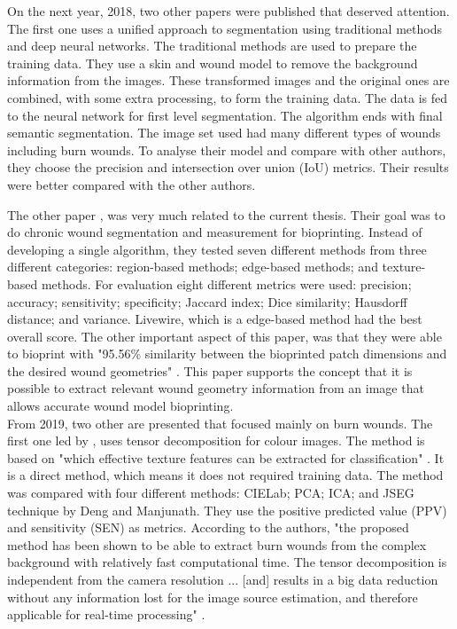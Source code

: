 On the next year, 2018, two other papers were published that deserved attention. The first one \cite{Li2018_composite_model_wound_segmentation_traditional_deep_nn} uses a unified approach to segmentation using traditional methods and deep neural networks. The traditional methods are used to prepare the training data. They use a skin and wound model to remove the background information from the images. These transformed images and the original ones are combined, with some extra processing, to form the training data. The data is fed to the neural network for first level segmentation. The algorithm ends with final semantic segmentation. The image set used had many different types of wounds including burn wounds. To analyse their model and compare with other authors, they choose the precision and intersection over union (IoU) metrics. Their results were better compared with the other authors.

The other paper \cite{Gholami2018_segmentation_measurements_chronic_wounds_bioprinting}, was very much related to the current thesis. Their goal was to do chronic wound segmentation and measurement for bioprinting. Instead of developing a single algorithm, they tested seven different methods from three different categories: region-based methods; edge-based methods; and texture-based methods. For evaluation eight different metrics were used: precision; accuracy; sensitivity; specificity; Jaccard index; Dice similarity; Hausdorff distance; and variance. Livewire, which is a edge-based method had the best overall score. The other important aspect of this paper, was that they were able to bioprint with "95.56\% similarity between the bioprinted patch dimensions and the desired wound geometries" \cite{Gholami2018_segmentation_measurements_chronic_wounds_bioprinting}. This paper supports the concept that it is possible to extract relevant wound geometry information from an image that allows accurate wound model bioprinting.\\

From 2019, two other are presented that focused mainly on burn wounds. The first one led by \citeauthor{Cirillo2019a_tensor_decomposition_segmentation_burn_wounds}, uses tensor decomposition for colour images. The method is based on "which effective texture features can be extracted for classification" \cite{Cirillo2019a_tensor_decomposition_segmentation_burn_wounds}. It is a direct method, which means it does not required training data. The method was compared with four different methods: CIELab; PCA; ICA; and JSEG technique by Deng and Manjunath. They use the positive predicted value (PPV) and sensitivity
(SEN) as metrics. According to the authors, "the proposed method has been shown to be able to extract burn wounds from the complex background with relatively fast computational time. The tensor decomposition is independent from the camera resolution ... [and] results in a big data reduction without any information lost for the image source estimation, and therefore applicable for real-time processing" \cite{Cirillo2019a_tensor_decomposition_segmentation_burn_wounds}.


